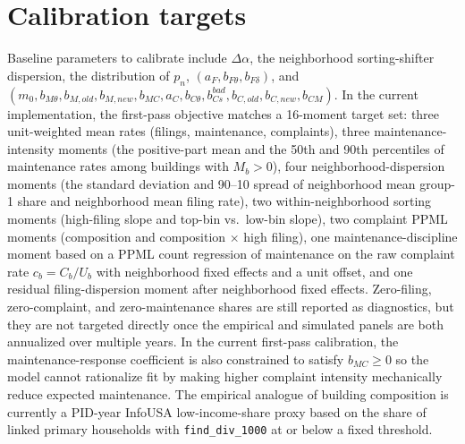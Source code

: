 \documentclass[11pt]{article}
\begin{document}
\section{Calibration targets}
Baseline parameters to calibrate include $\Delta\alpha$, the neighborhood sorting-shifter dispersion, the distribution of $p_n$, $(a_F,b_{F\theta},b_{F\delta})$, and $(m_0,b_{M\theta},b_{M,old},b_{M,new},b_{MC},a_C,b_{C\theta},b_{Cs}^{bad},b_{C,old},b_{C,new},b_{CM})$. In the current implementation, the first-pass objective matches a 16-moment target set: three unit-weighted mean rates (filings, maintenance, complaints), three maintenance-intensity moments (the positive-part mean and the 50th and 90th percentiles of maintenance rates among buildings with $M_b>0$), four neighborhood-dispersion moments (the standard deviation and 90--10 spread of neighborhood mean group-1 share and neighborhood mean filing rate), two within-neighborhood sorting moments (high-filing slope and top-bin vs.\ low-bin slope), two complaint PPML moments (composition and composition $\times$ high filing), one maintenance-discipline moment based on a PPML count regression of maintenance on the raw complaint rate $c_b=C_b/U_b$ with neighborhood fixed effects and a unit offset, and one residual filing-dispersion moment after neighborhood fixed effects. Zero-filing, zero-complaint, and zero-maintenance shares are still reported as diagnostics, but they are not targeted directly once the empirical and simulated panels are both annualized over multiple years. In the current first-pass calibration, the maintenance-response coefficient is also constrained to satisfy $b_{MC}\ge 0$ so the model cannot rationalize fit by making higher complaint intensity mechanically reduce expected maintenance.
The empirical analogue of building composition is currently a PID-year InfoUSA low-income-share proxy based on the share of linked primary households with \texttt{find\_div\_1000} at or below a fixed threshold.
\end{document}
